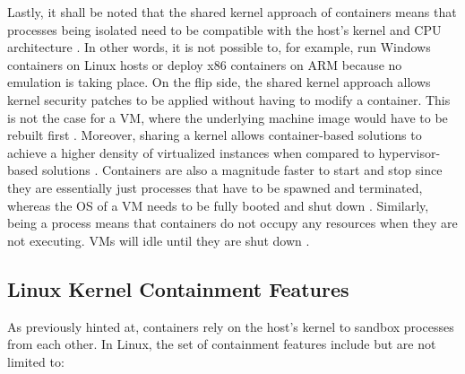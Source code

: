 Lastly, it shall be noted that the shared kernel approach of containers means that processes being isolated need to be compatible with the host's kernel and \acs{CPU} architecture \cite[p.~386]{morabito2015hypervisors} \cite[p.~2]{eder2016hypervisor}. In other words, it is not possible to, for example, run Windows containers on Linux hosts or deploy x86 containers on ARM because no emulation is taking place. On the flip side, the shared kernel approach allows kernel security patches to be applied without having to modify a container. This is not the case for a \acs{VM}, where the underlying machine image would have to be rebuilt first \cite[p.~3]{eder2016hypervisor}. Moreover, sharing a kernel allows container-based solutions to achieve a higher density of virtualized instances when compared to hypervisor-based solutions \cite[p.~386]{morabito2015hypervisors} \cite[p.~204]{kang2016container}. Containers are also a magnitude faster to start and stop since they are essentially just processes that have to be spawned and terminated, whereas the \acs{OS} of a \acs{VM} needs to be fully booted and shut down \cite[p.~2]{merkel2014docker} \cite[p.~2]{eder2016hypervisor}. Similarly, being a process means that containers do not occupy any resources when they are not executing. \acsp{VM} will idle until they are shut down \cite[p.~2]{merkel2014docker}.


\subsection{Linux Kernel Containment Features}
\label{sec:linux-kernel-containment-features}

As previously hinted at, containers rely on the host's kernel to sandbox processes from each other. In Linux, the set of containment features include but are not limited to:

